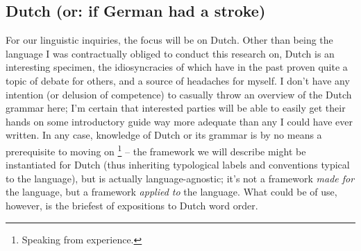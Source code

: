 \subsection{Dutch (or: if German had a stroke)}
For our linguistic inquiries, the focus will be on Dutch.
Other than being the language I was contractually obliged to conduct this research on, Dutch is an interesting specimen, the idiosyncracies of which have in the past proven quite a topic of debate for others, and a source of headaches for myself.
I don't have any intention (or delusion of competence) to casually throw an overview of the Dutch grammar here; I'm certain that interested parties will be able to easily get their hands on some introductory guide way more adequate than any I could have ever written.
In any case, knowledge of Dutch or its grammar is by no means a prerequisite to moving on%
	\footnote{Speaking from experience.} -- the framework we will describe might be instantiated for Dutch (thus inheriting typological labels and conventions typical to the language), but is actually language-agnostic; it's not a framework \textit{made for} the language, but a framework \textit{applied to} the language.	
What could be of use, however, is the briefest of expositions to Dutch word order.

